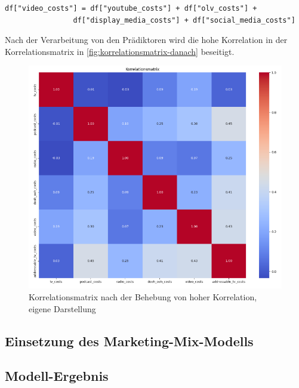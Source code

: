 \begin{lstlisting}
df["video_costs"] = df["youtube_costs"] + df["olv_costs"] + 
                df["display_media_costs"] + df["social_media_costs"]
\end{lstlisting}
Nach der Verarbeitung von den Prädiktoren wird die hohe Korrelation in der Korrelationsmatrix in \autoref{fig:korrelationsmatrix-danach} beseitigt.
\begin{figure}
    \centering
    \includegraphics[width=1\linewidth]{images/korrelationafter.png}
    \caption{Korrelationsmatrix nach der Behebung von hoher Korrelation, eigene Darstellung}
    \label{fig:korrelationsmatrix-danach}
\end{figure}
\subsection{Einsetzung des Marketing-Mix-Modells}
\subsection{Modell-Ergebnis}
